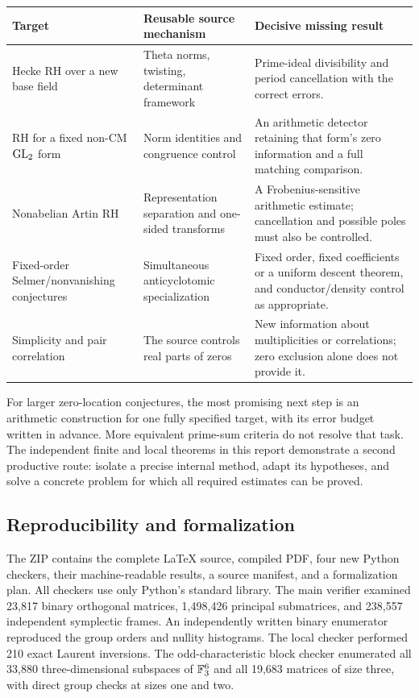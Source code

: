 \begin{center}\small
\begin{tabular}{P{.21\linewidth}P{.33\linewidth}P{.36\linewidth}}
\toprule
Target & Reusable source mechanism & Decisive missing result\\
\midrule
Hecke RH over a new base field & Theta norms, twisting, determinant framework & Prime-ideal divisibility and period cancellation with the correct errors.\\[5pt]
RH for a fixed non-CM $\operatorname{GL}_2$ form & Norm identities and congruence control & An arithmetic detector retaining that form's zero information and a full matching comparison.\\[5pt]
Nonabelian Artin RH & Representation separation and one-sided transforms & A Frobenius-sensitive arithmetic estimate; cancellation and possible poles must also be controlled.\\[5pt]
Fixed-order Selmer/nonvanishing conjectures & Simultaneous anticyclotomic specialization & Fixed order, fixed coefficients or a uniform descent theorem, and conductor/density control as appropriate.\\[5pt]
Simplicity and pair correlation & The source controls real parts of zeros & New information about multiplicities or correlations; zero exclusion alone does not provide it.\\
\bottomrule
\end{tabular}
\end{center}

For larger zero-location conjectures, the most promising next step is an arithmetic construction for one fully specified target, with its error budget written in advance. More equivalent prime-sum criteria do not resolve that task. The independent finite and local theorems in this report demonstrate a second productive route: isolate a precise internal method, adapt its hypotheses, and solve a concrete problem for which all required estimates can be proved.

\subsection{Reproducibility and formalization}

The ZIP contains the complete \LaTeX{} source, compiled PDF, four new Python checkers, their machine-readable results, a source manifest, and a formalization plan. All checkers use only Python's standard library. The main verifier examined 23,817 binary orthogonal matrices, 1,498,426 principal submatrices, and 238,557 independent symplectic frames. An independently written binary enumerator reproduced the group orders and nullity histograms. The local checker performed 210 exact Laurent inversions. The odd-characteristic block checker enumerated all 33,880 three-dimensional subspaces of $\mathbb F_3^6$ and all 19,683 matrices of size three, with direct group checks at sizes one and two.

